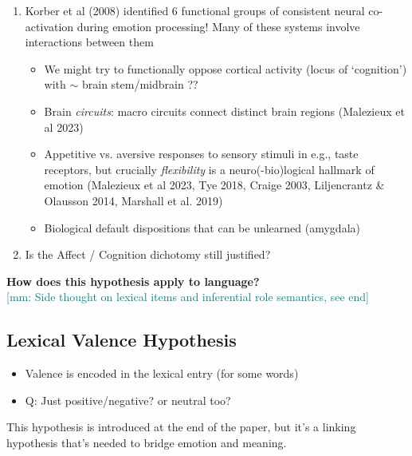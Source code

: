 \documentclass[12pt,letterpaper,table,svgnames,dvipsnames]{article}
\newcommand{\mm}[1]{\textcolor{teal}{[mm: #1]}}
\begin{document}
\begin{enumerate}
    \item Korber et al (2008) identified 6 functional groups of consistent neural co-activation during emotion processing! Many of these systems involve interactions between them

        \begin{itemize}
            \item We might try to functionally oppose cortical activity (locus of `cognition') with $\sim$ brain stem/midbrain ??

            \item Brain \emph{circuits}: macro circuits connect distinct brain regions (Malezieux et al 2023)

            \item Appetitive vs. aversive responses to sensory stimuli in e.g., taste receptors, but crucially \emph{flexibility} is a neuro(-bio)logical hallmark of emotion (Malezieux et al 2023, Tye 2018, Craige 2003, Liljencrantz \& Olausson 2014, Marshall et al. 2019)

            \item Biological default dispositions that can be unlearned (amygdala)
        \end{itemize}

    \item Is the Affect / Cognition dichotomy still justified?

\end{enumerate}

\noindent \textbf{How does this hypothesis apply to language?} \\

\mm{Side thought on lexical items and inferential role semantics, see end}


\subsection{Lexical Valence Hypothesis}


\begin{itemize}
    \item Valence is encoded in the lexical entry (for some words)
    \item Q: Just positive/negative? or neutral too?
\end{itemize}


\noindent This hypothesis is introduced at the end of the paper, but it's a linking hypothesis that's needed to bridge emotion and meaning.\\
\end{document}
